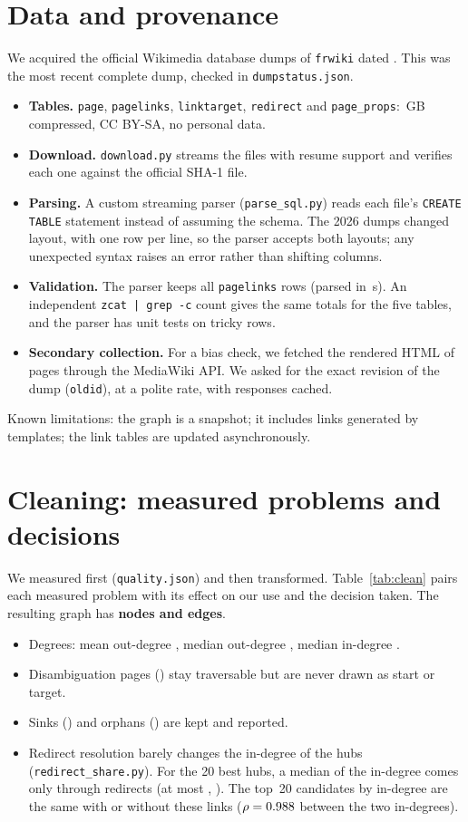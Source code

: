 \documentclass[10pt,a4paper]{article}
\begin{document}
\section{Data and provenance}
We acquired the official Wikimedia database dumps of \texttt{frwiki} dated \DumpDate. This was the
most recent complete dump, checked in \texttt{dumpstatus.json}.
\begin{itemize}
\item \textbf{Tables.} \texttt{page}, \texttt{pagelinks}, \texttt{linktarget}, \texttt{redirect} and
  \texttt{page\_props}: \RawGB\,GB compressed, CC BY-SA, no personal data.
\item \textbf{Download.} \texttt{download.py} streams the files with resume support and verifies
  each one against the official SHA-1 file.
\item \textbf{Parsing.} A custom streaming parser (\texttt{parse\_sql.py}) reads each file's
  \texttt{CREATE TABLE} statement instead of assuming the schema. The 2026 dumps changed layout,
  with one row per line, so the parser accepts both layouts; any unexpected syntax raises an error
  rather than shifting columns.
\item \textbf{Validation.} The parser keeps all \NLinkRows{} \texttt{pagelinks} rows (parsed in
  \ParseSecondsPagelinks\,s). An independent \texttt{zcat | grep -c} count gives the same totals
  for the five tables, and the parser has unit tests on tricky rows.
\item \textbf{Secondary collection.} For a bias check, we fetched the rendered HTML of
  \BiasNPages{} pages through the MediaWiki API. We asked for the exact revision of the dump
  (\texttt{oldid}), at a polite rate, with responses cached.
\end{itemize}
Known limitations: the graph is a snapshot; it includes links generated by templates; the link
tables are updated asynchronously.

\section{Cleaning: measured problems and decisions}
We measured first (\texttt{quality.json}) and then transformed. Table~\ref{tab:clean}
pairs each measured problem with its effect on our use and the decision taken. The resulting graph
has \textbf{\NArticles{} nodes and \NEdges{} edges}.
\begin{itemize}
\item Degrees: mean out-degree \MeanOutDeg, median out-degree \MedianOutDeg, median in-degree
  \MedianInDeg.
\item Disambiguation pages (\NDisambig) stay traversable but are never drawn as start or target.
\item Sinks (\NSinks) and orphans (\NOrphans) are kept and reported.
\item Redirect resolution barely changes the in-degree of the hubs (\texttt{redirect\_share.py}).
  For the 20 best hubs, a median \RedirTopMedShare{} of the in-degree comes only through redirects
  (at most \RedirTopMaxShare, \emph{\RedirTopMaxTitle}). The top~20 candidates by in-degree are
  the same with or without these links ($\rho=0.988$ between the two in-degrees).
\end{itemize}
\end{document}
